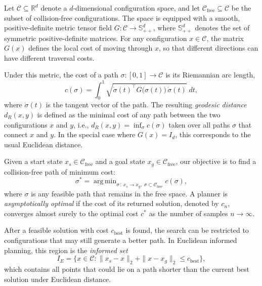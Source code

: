 \documentclass[journal]{IEEEtran}
\newcommand{\Cfree}{\mathcal{C}_{\mathrm{free}}}
\newcommand{\Cspace}{\mathcal{C}}
\newcommand{\IE}{I_{\!E}}
\newcommand{\dR}{d_{\!R}}
\newcommand{\SPD}{\mathbb{S}_{++}^{d}}
\DeclareMathOperator*{\argmin}{arg\,min}
\begin{document}
Let $\Cspace \subseteq \mathbb{R}^d$ denote a $d$-dimensional
configuration space, and let $\Cfree \subseteq \Cspace$ be the subset of
collision-free configurations. The space is equipped with a smooth,
positive-definite metric tensor field
$G : \Cspace \to \SPD$, where $\SPD$ denotes the set of symmetric
positive-definite matrices. For any configuration $x \in \Cspace$, the
matrix $G(x)$ defines the local cost of moving through $x$, so that
different directions can have different traversal costs.

Under this metric, the cost of a path $\sigma : [0,1] \to \Cspace$ is
its Riemannian arc length,
\begin{equation}\label{eq:cost}
  c(\sigma) = \int_0^1 \!\sqrt{\dot{\sigma}(t)^\top G\bigl(\sigma(t)\bigr)\, \dot{\sigma}(t)}\; dt,
\end{equation}
where $\dot{\sigma}(t)$ is the tangent vector of the path. The resulting
\emph{geodesic distance} $\dR(x,y)$ is defined as the minimal cost of any path between the two
configurations $x$ and $y$, i.e.,
$\dR(x,y) = \inf_\sigma c(\sigma)$ taken over all paths $\sigma$ that connect
$x$ and $y$. In the special case where $G(x) = I_d$, this corresponds to the usual Euclidean
distance.

Given a start state $x_s \in \Cfree$ and a goal state $x_g \in \Cfree$,
our objective is to find a collision-free path of minimum cost:
\begin{equation}\label{eq:opt}
  \sigma^* = \argmin_{\sigma \,:\, x_s \to x_g,\; \sigma \subset \Cfree} c(\sigma),
\end{equation}
where $\sigma$ is any feasible path that remains in the free space. A
planner is \emph{asymptotically optimal} if the cost of its returned
solution, denoted by $c_n$, converges almost surely to the optimal cost
$c^*$ as the number of samples $n \to \infty$.

After a feasible solution with cost $c_{\mathrm{best}}$ is found, the
search can be restricted to configurations that may still generate a
better path. In Euclidean informed planning, this region is the
\emph{informed set}
\begin{equation}\label{eq:IE}
  \IE = \bigl\{ x \in \Cspace : \|x_s - x\|_2 + \|x - x_g\|_2 \le c_{\mathrm{best}} \bigr\},
\end{equation}
which contains all points that could lie on a path shorter than the
current best solution under Euclidean distance.
\end{document}

